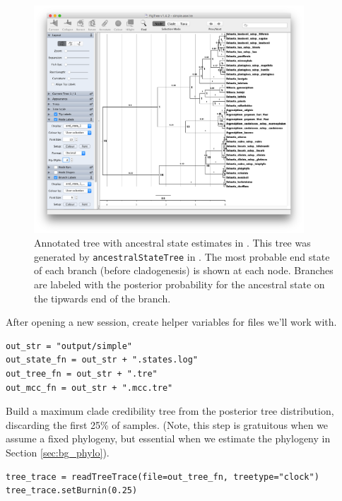 \begin{figure}[!h]
\centering
\includegraphics[width=0.9\textwidth]{figures/fig_simple_FigTree_ase.png}
\caption{Annotated tree with ancestral state estimates in \FigTree.
This tree was generated by {\tt ancestralStateTree} in \RevBayes.
The most probable end state of each branch (before cladogenesis) is shown at each node.
Branches are labeled with the posterior probability for the ancestral state on the tipwards end of the branch.
}
\label{fig:simple_FigTree_ase}
\end{figure}

After opening a new \RevBayes session, create helper variables for files we'll work with.
\begin{snugshade}
\begin{lstlisting}
out_str = "output/simple"
out_state_fn = out_str + ".states.log"
out_tree_fn = out_str + ".tre"
out_mcc_fn = out_str + ".mcc.tre" 
\end{lstlisting}
\end{snugshade}

Build a maximum clade credibility tree from the posterior tree distribution, discarding the first 25\% of samples.
(Note, this step is gratuitous when we assume a fixed phylogeny, but essential when we estimate the phylogeny in Section \ref{sec:bg_phylo}).

\begin{snugshade}
\begin{lstlisting}
tree_trace = readTreeTrace(file=out_tree_fn, treetype="clock")
tree_trace.setBurnin(0.25)
\end{lstlisting}
\end{snugshade}

